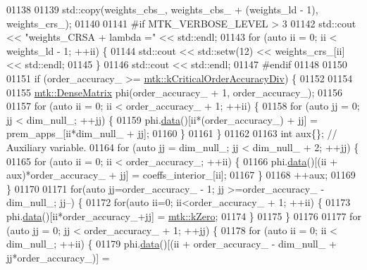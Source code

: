 \begin{DoxyCode}
{{01138 
01139   std::copy(weights\_cbs\_, weights\_cbs\_ + (weights\_ld - 1), weights\_crs\_);
01140 
01141 \textcolor{preprocessor}{  #if MTK\_VERBOSE\_LEVEL > 3}
01142   std::cout << \textcolor{stringliteral}{"weights\_CRSA + lambda ="} << std::endl;
01143   \textcolor{keywordflow}{for} (\textcolor{keyword}{auto} ii = 0; ii < weights\_ld - 1; ++ii) \{
01144     std::cout << std::setw(12) << weights\_crs\_[ii] << std::endl;
01145   \}
01146   std::cout << std::endl;
01147 \textcolor{preprocessor}{  #endif}
01148 
01150 
01151   \textcolor{keywordflow}{if} (order\_accuracy\_ >= \hyperlink{group__c01-roots_ga0898eef2108473e44a5223932d571c31}{mtk::kCriticalOrderAccuracyDiv}) \{
01152 
01154 
01155     \hyperlink{classmtk_1_1DenseMatrix}{mtk::DenseMatrix} phi(order\_accuracy\_ + 1, order\_accuracy\_);
01156 
01157     \textcolor{keywordflow}{for} (\textcolor{keyword}{auto} ii = 0; ii < order\_accuracy\_ + 1; ++ii) \{
01158       \textcolor{keywordflow}{for} (\textcolor{keyword}{auto} jj = 0; jj < dim\_null\_; ++jj) \{
01159         phi.\hyperlink{classmtk_1_1DenseMatrix_a0c33b8a9e01d157c61ddbdf807c25d84}{data}()[ii*(order\_accuracy\_) + jj] = prem\_apps\_[ii*dim\_null\_ + jj];
01160       \}
01161     \}
01162 
01163     \textcolor{keywordtype}{int} aux\{\};  \textcolor{comment}{// Auxiliary variable.}
01164     \textcolor{keywordflow}{for} (\textcolor{keyword}{auto} jj = dim\_null\_; jj < dim\_null\_ + 2; ++jj) \{
01165       \textcolor{keywordflow}{for} (\textcolor{keyword}{auto} ii = 0; ii < order\_accuracy\_; ++ii) \{
01166         phi.\hyperlink{classmtk_1_1DenseMatrix_a0c33b8a9e01d157c61ddbdf807c25d84}{data}()[(ii + aux)*order\_accuracy\_ + jj] = coeffs\_interior\_[ii];
01167       \}
01168       ++aux;
01169     \}
01170 
01171     \textcolor{keywordflow}{for}(\textcolor{keyword}{auto} jj=order\_accuracy\_ - 1; jj >=order\_accuracy\_ - dim\_null\_; jj--) \{
01172       \textcolor{keywordflow}{for}(\textcolor{keyword}{auto} ii=0; ii<order\_accuracy\_ + 1; ++ii) \{
01173         phi.\hyperlink{classmtk_1_1DenseMatrix_a0c33b8a9e01d157c61ddbdf807c25d84}{data}()[ii*order\_accuracy\_+jj] = \hyperlink{group__c01-roots_ga59a451a5fae30d59649bcda274fea271}{mtk::kZero};
01174       \}
01175     \}
01176 
01177     \textcolor{keywordflow}{for} (\textcolor{keyword}{auto} jj = 0; jj < order\_accuracy\_ + 1; ++jj) \{
01178       \textcolor{keywordflow}{for} (\textcolor{keyword}{auto} ii = 0; ii < dim\_null\_; ++ii) \{
01179         phi.\hyperlink{classmtk_1_1DenseMatrix_a0c33b8a9e01d157c61ddbdf807c25d84}{data}()[(ii + order\_accuracy\_ - dim\_null\_ + jj*order\_accuracy\_)] =
}}
\end{DoxyCode}

